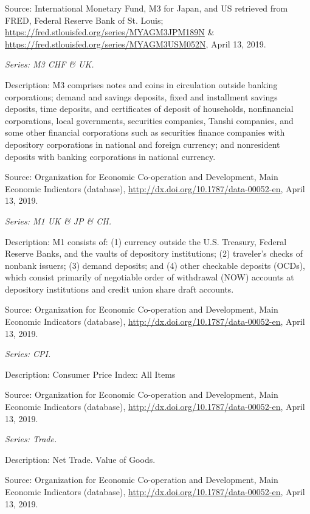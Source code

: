 Source: International Monetary Fund, M3 for Japan, and US retrieved from FRED, Federal Reserve Bank of St. Louis; \url{https://fred.stlouisfed.org/series/MYAGM3JPM189N} \& \url{https://fred.stlouisfed.org/series/MYAGM3USM052N}, April 13, 2019.

\textit{Series: M3 CHF \& UK.}

Description: M3 comprises notes and coins in circulation outside banking corporations; demand and savings deposits, fixed and installment savings deposits, time deposits, and certificates of deposit of households, nonfinancial corporations, local governments, securities companies, Tanshi companies, and some other financial corporations such as securities finance companies with depository corporations in national and foreign currency; and nonresident deposits with banking corporations in national currency. 

Source: Organization for Economic Co-operation and Development, Main Economic Indicators (database), \url{http://dx.doi.org/10.1787/data-00052-en}, April 13, 2019.

\textit{Series: M1 UK \& JP \& CH.}

Description: M1 consists of: (1) currency outside the U.S. Treasury, Federal Reserve Banks, and the vaults of depository institutions; (2) traveler's checks of nonbank issuers; (3) demand deposits; and (4) other checkable deposits (OCDs), which consist primarily of negotiable order of withdrawal (NOW) accounts at depository institutions and credit union share draft accounts.

Source: Organization for Economic Co-operation and Development, Main Economic Indicators (database), \url{http://dx.doi.org/10.1787/data-00052-en}, April 13, 2019.

\textit{Series: CPI.}

Description: Consumer Price Index: All Items

Source: Organization for Economic Co-operation and Development, Main Economic Indicators (database), \url{http://dx.doi.org/10.1787/data-00052-en}, April 13, 2019.


\textit{Series: Trade.}

Description: Net Trade. Value of Goods.

Source: Organization for Economic Co-operation and Development, Main Economic Indicators (database), \url{http://dx.doi.org/10.1787/data-00052-en}, April 13, 2019.